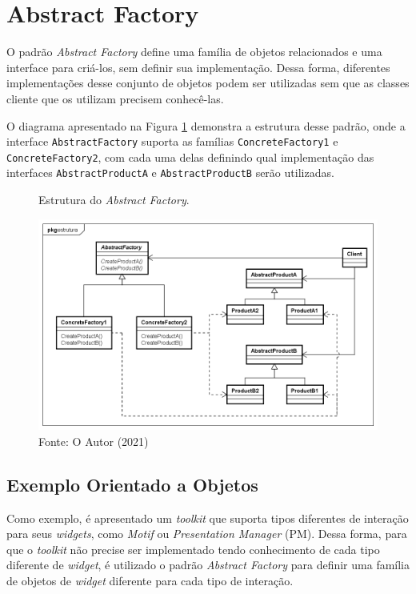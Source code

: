 \section{Abstract Factory}

O padrão \textit{Abstract Factory} define uma família 
de objetos relacionados e uma interface para 
criá-los, sem definir sua implementação. Dessa 
forma, diferentes implementações desse 
conjunto de objetos podem ser utilizadas 
sem que as classes cliente que os utilizam 
precisem conhecê-las.\cite{gamma:1995}

O diagrama apresentado na Figura \ref{abfactory_struct} 
demonstra a estrutura desse padrão, onde a 
interface \texttt{AbstractFactory} suporta as famílias 
\texttt{ConcreteFactory1} e \texttt{ConcreteFactory2}, com cada uma 
delas definindo qual implementação das interfaces 
\texttt{AbstractProductA} e \texttt{AbstractProductB} serão 
utilizadas.

\begin{figure}[htb]
	\caption{\label{abfactory_struct}Estrutura do \textit{Abstract Factory}.}
	\begin{center}
	    \includegraphics[scale=0.5]{5_padroes-contexto-funcional/5.1_criacionais/5.1.2_abstract-factory/abstractfactory_estrutura.png}
	\end{center}
  \caption*{Fonte: O Autor (2021)}
\end{figure}

\subsection*{Exemplo Orientado a Objetos}

Como exemplo, é apresentado um \textit{toolkit} 
que suporta tipos diferentes de interação para 
seus \textit{widgets}, como \textit{Motif} ou \textit{Presentation 
Manager} (PM). Dessa forma, para que o \textit{toolkit} 
não precise ser implementado tendo conhecimento 
de cada tipo diferente de \textit{widget}, é 
utilizado o padrão \textit{Abstract Factory} para 
definir uma família de objetos de \textit{widget} 
diferente para cada tipo de interação. 

